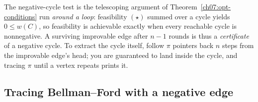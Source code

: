 \begin{whybox}
The negative-cycle test is the telescoping argument of
Theorem~\ref{ch07:opt-conditions} run \emph{around a loop}: feasibility $(\star)$ summed
over a cycle yields $0\le w(C)$, so feasibility is achievable exactly when every reachable
cycle is nonnegative. A surviving improvable edge after $n-1$ rounds is thus a
\emph{certificate} of a negative cycle. To extract the cycle itself, follow $\pi$ pointers
back $n$ steps from the improvable edge's head; you are guaranteed to land inside the
cycle, and tracing $\pi$ until a vertex repeats prints it.
\end{whybox}

\subsection{Tracing Bellman--Ford with a negative edge}

